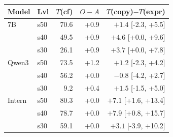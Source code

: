 \begin{tabular}{@{}llrrr@{}}
\toprule
Model & Lvl & $T$(cf) & $O-A$ & $T$(copy)$-T$(expr) \\
\midrule
7B & s50 & 70.6 & +0.9 & $+1.4$ {\scriptsize[-2.3, +5.5]} \\
 & s40 & 49.5 & +0.9 & $+4.6$ {\scriptsize[+0.0, +9.6]} \\
 & s30 & 26.1 & +0.9 & $+3.7$ {\scriptsize[+0.0, +7.8]} \\
Qwen3 & s50 & 73.5 & +1.2 & $+1.2$ {\scriptsize[-2.3, +4.2]} \\
 & s40 & 56.2 & +0.0 & $-0.8$ {\scriptsize[-4.2, +2.7]} \\
 & s30 & 9.2 & +0.4 & $+1.5$ {\scriptsize[-1.5, +5.0]} \\
Intern & s50 & 80.3 & +0.0 & $+7.1$ {\scriptsize[+1.6, +13.4]} \\
 & s40 & 78.7 & +0.0 & $+7.9$ {\scriptsize[+0.8, +15.7]} \\
 & s30 & 59.1 & +0.0 & $+3.1$ {\scriptsize[-3.9, +10.2]} \\
\bottomrule
\end{tabular}
